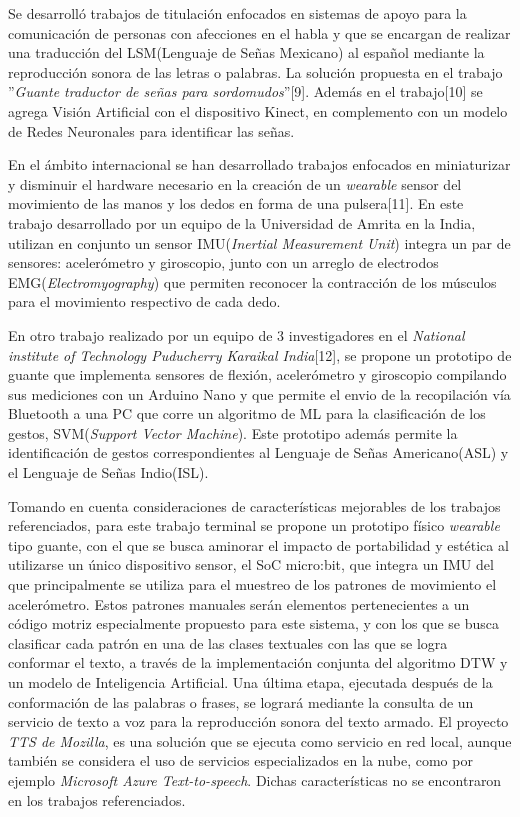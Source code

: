 %
%
\hfill \break
\justifying
Se desarrolló trabajos de titulación enfocados en sistemas de apoyo para la comunicación de personas con afecciones en el habla y que se encargan de realizar una traducción del LSM(Lenguaje de Señas Mexicano) al español mediante la reproducción sonora de las letras o palabras. La solución propuesta en el trabajo ”\textit{Guante traductor de señas para sordomudos}”[9]. Además en el trabajo[10] se agrega Visión Artificial con el dispositivo Kinect, en complemento con un modelo de Redes Neuronales para identificar las señas.

\hfill \break
\justifying
En el ámbito internacional se han desarrollado trabajos enfocados en miniaturizar y disminuir el hardware necesario en la creación de un \textit{wearable} sensor del movimiento de las manos y los dedos en forma de una pulsera[11]. En este trabajo desarrollado por un equipo de la Universidad de Amrita en la India, utilizan en conjunto un sensor IMU(\textit{Inertial Measurement Unit}) integra un par de sensores: acelerómetro y giroscopio, junto con un arreglo de electrodos EMG(\textit{Electromyography}) que permiten reconocer la contracción de los músculos para el movimiento respectivo de cada dedo.

\hfill \break
\justifying
En otro trabajo realizado por un equipo de 3 investigadores en el \textit{National institute of Technology Puducherry Karaikal India}[12], se propone un prototipo de guante que implementa sensores de flexión, acelerómetro y giroscopio compilando sus mediciones con un Arduino Nano y que permite el envio de la recopilación vía Bluetooth a una PC que corre un algoritmo de ML para la clasificación de los gestos, SVM(\textit{Support Vector Machine}). Este prototipo además permite la identificación de gestos correspondientes al Lenguaje de Señas Americano(ASL) y el Lenguaje de Señas Indio(ISL).

\hfill \break
\justifying
Tomando en cuenta consideraciones de características mejorables de los trabajos referenciados, para este trabajo terminal se propone un prototipo físico \textit{wearable} tipo guante, con el que se busca aminorar el impacto de portabilidad y estética al utilizarse un único dispositivo sensor, el SoC micro:bit, que integra un IMU del que principalmente se utiliza para el muestreo de los patrones de movimiento el acelerómetro. Estos patrones manuales serán elementos pertenecientes a un código motriz especialmente propuesto para este sistema, y con los que se busca clasificar cada patrón en una de las clases textuales con las que se logra conformar el texto, a través de la implementación conjunta del algoritmo DTW y un modelo de Inteligencia Artificial.
Una última etapa, ejecutada después de la conformación de las palabras o frases, se logrará mediante la consulta de un servicio de texto a voz para la reproducción sonora del texto armado. El proyecto \textit{TTS de Mozilla}, es una solución que se ejecuta como servicio en red local, aunque también se considera el uso de servicios especializados en la nube, como por ejemplo \textit{Microsoft Azure Text-to-speech}.
Dichas características no se encontraron en los trabajos referenciados.





